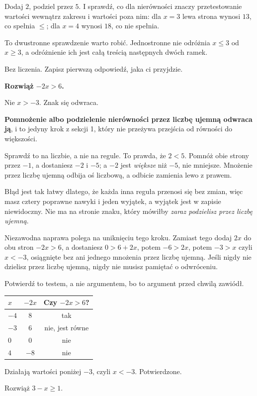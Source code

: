 \begin{fr}
Dodaj $2$, podziel przez $5$. I sprawdź, co dla nierówności znaczy
przetestowanie wartości wewnątrz zakresu i wartości poza nim: dla $x = 3$ lewa
strona wynosi $13$, co spełnia $\le$; dla $x = 4$ wynosi $18$, co nie spełnia.

To dwustronne sprawdzenie warto robić. Jednostronne nie odróżnia $x \le 3$ od
$x \ge 3$, a odróżnienie ich jest całą treścią następnych dwóch ramek.

Bez liczenia. Zapisz pierwszą odpowiedź, jaka ci przyjdzie.

\textbf{Rozwiąż $-2x > 6$.}
\dotline
\nextframe
\end{fr}

\begin{fr}
Nie $x > -3$. Znak się odwraca.

\begin{trapbox}
\textbf{Pomnożenie albo podzielenie nierówności przez liczbę ujemną odwraca
ją}, i to jedyny krok z sekcji 1, który nie przeżywa przejścia od równości do
większości.

Sprawdź to na liczbie, a nie na regule. To prawda, że $2 < 5$. Pomnóż obie
strony przez $-1$, a dostaniesz $-2$ i $-5$; a $-2$ jest \emph{większe} niż
$-5$, nie mniejsze. Mnożenie przez liczbę ujemną odbija oś liczbową, a odbicie
zamienia lewo z prawem.

Błąd jest tak łatwy dlatego, że każda inna reguła przenosi się bez zmian, więc
masz cztery poprawne nawyki i jeden wyjątek, a wyjątek jest w zapisie
niewidoczny. Nie ma na stronie znaku, który mówiłby \emph{zaraz podzielisz
przez liczbę ujemną}.

Niezawodna naprawa polega na uniknięciu tego kroku. Zamiast tego dodaj $2x$
do obu stron $-2x > 6$, a dostaniesz $0 > 6 + 2x$, potem $-6 > 2x$, potem
$-3 > x$ \dash{} czyli $x < -3$, osiągnięte bez ani jednego mnożenia przez
liczbę ujemną. Jeśli nigdy nie dzielisz przez liczbę ujemną, nigdy nie musisz
pamiętać o odwróceniu.
\end{trapbox}
\end{fr}

\begin{fr}
Potwierdź to testem, a nie argumentem, bo to argument przed chwilą zawiódł.

\begin{center}
\begin{tabular}{lcc}
\toprule
$x$ & $-2x$ & Czy $-2x > 6$? \\
\midrule
$-4$ & $8$ & tak \\
$-3$ & $6$ & nie, jest równe \\
$0$ & $0$ & nie \\
$4$ & $-8$ & nie \\
\bottomrule
\end{tabular}
\end{center}

Działają wartości poniżej $-3$, czyli $x < -3$. Potwierdzone.

Rozwiąż $3 - x \ge 1$.
\nextframe
\end{fr}

